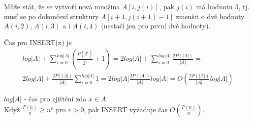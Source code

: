 
\begin{pozn}
Může stát, že se vytvoří nová množina $A[i,j(i)]$, pak $j(i)$ má hodnotu
5, tj. musí se po dokončení struktury $A[i+1,j(i+1)-1]$ zmenšit o dvě
hodnoty $A(i,2)$, $A(i,3)$ a i $A(i,4)$ (nestačí jen pro první dvě hodnoty).
\end{pozn}

Čas pro INSERT(x) je \\
\begin{multline}
log |A| + \sum_{i=0}^{log |A|} (\frac{P(2^i)}{2^i} + 1) = 
2log |A| + \sum_{i=0}^{log |A|} \frac{2P(|A|)}{|A|} = \\
2log |A| + \frac{2P(|A|)}{|A|} \sum_{i=0}^{log |A|} 1 = 
2log |A| \frac{2P(|A|)}{|A|} log |A| = O(\frac{2P(|A|)}{|A|} log |A|)
\end{multline}

$log |A|$ - čas pro zjištění zda $x \in A$ \\

Když $\frac{P(n)}{n} \geq n^{\varepsilon}$ pro $\varepsilon > 0$, pak INSERT
vyžaduje čas $O(\frac{P(n)}{n})$.

